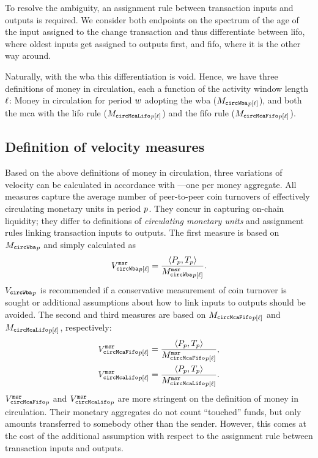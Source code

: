 To resolve the ambiguity, an assignment rule between transaction inputs and
outputs is required.  %
We consider both endpoints on the spectrum of the age of the input assigned
to the change transaction and thus differentiate between \ac{lifo}, where
oldest inputs get assigned to outputs first, and \ac{fifo}, where it is the
other way around.  %

Naturally, with the \ac{wba} this differentiation is void.  %
Hence, we have three definitions of money in circulation, each a function of
the activity window length ${\ell}$: %
Money in circulation for period ${w}$ adopting the \ac{wba}
($ {{M_{\mathtt{circWba}}}_{{p}[{\ell}]}} $), and both the \ac{mca} with the \ac{lifo} rule
($ {{M_{\mathtt{circMcaLifo}}}_{{p}[{\ell}]}} $) and the \ac{fifo} rule ($ {{M_{\mathtt{circMcaFifo}}}_{{p}[{\ell}]}} $).

\subsection{Definition of velocity measures}
\label{sec:cc_money_seg:sub:}%

Based on the above definitions of money in circulation, three variations of
velocity can be calculated in accordance with ---one
per money aggregate.  %
%
All measures capture the average number of peer-to-peer coin turnovers of
effectively circulating monetary units in period ${p}$.  They concur in
capturing on-chain liquidity; they differ \wrt to definitions of
\textit{circulating monetary units} and assignment rules linking transaction
inputs to outputs.  %
% 
The first measure is based on ${{M_{\mathtt{circWba}}}_{p}}$ and simply calculated as %
\begin{align}%
  \label{equ:VCircWbEstPWl}
  \VCircWbEstPWl = \frac{\langle\Pp,\Tp\rangle}{\MCircWbEstPWl}.%
\end{align}%
${{V_{\mathtt{circWba}}}_{p}}$ is recommended if a conservative measurement of coin turnover is
sought or additional assumptions about how to link inputs to outputs should
be avoided.
% 
The second and third measures are based on ${{M_{\mathtt{circMcaFifo}}}_{{p}[{\ell}]}}$ and ${{M_{\mathtt{circMcaLifo}}}_{{p}[{\ell}]}}$,
respectively:  %
\begin{align}%
  \label{equ:VCircMfEstPWl}
  \VCircMfEstPWl = \frac{\langle\Pp,\Tp\rangle}{\MCircMfEstPWl}, \\
  \VCircMlEstPWl = \frac{\langle\Pp,\Tp\rangle}{\MCircMlEstPWl}.%
  \label{equ:VCircMlEstPWl}
\end{align}%
%
${{V_{\mathtt{circMcaFifo}}^{\mathtt{msr}}}_{p}}$ and ${{V_{\mathtt{circMcaLifo}}^{\mathtt{msr}}}_{p}}$ are more stringent on the definition of
money in circulation.  %
Their monetary aggregates do not count ``touched'' funds, but only amounts
transferred to somebody other than the sender.
However, this comes at the cost of the additional assumption with respect to the assignment rule between transaction inputs and outputs.  %

